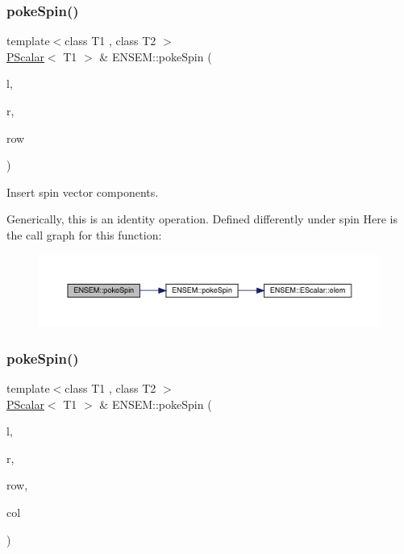 \subsubsection{\texorpdfstring{pokeSpin()}{pokeSpin()}\hspace{0.1cm}{\footnotesize\ttfamily [1/2]}}
{\footnotesize\ttfamily template$<$class T1 , class T2 $>$ \\
\mbox{\hyperlink{classENSEM_1_1PScalar}{P\+Scalar}}$<$ T1 $>$ \& E\+N\+S\+E\+M\+::poke\+Spin (\begin{DoxyParamCaption}\item[{\mbox{\hyperlink{classENSEM_1_1PScalar}{P\+Scalar}}$<$ T1 $>$ \&}]{l,  }\item[{const \mbox{\hyperlink{classENSEM_1_1PScalar}{P\+Scalar}}$<$ T2 $>$ \&}]{r,  }\item[{int}]{row }\end{DoxyParamCaption})\hspace{0.3cm}{\ttfamily [inline]}}



Insert spin vector components. 

Generically, this is an identity operation. Defined differently under spin Here is the call graph for this function\+:\nopagebreak
\begin{figure}[H]
\begin{center}
\leavevmode
\includegraphics[width=350pt]{db/dcc/group__primscalar_gaef0821cb16093e96134a98e5a765c45a_cgraph}
\end{center}
\end{figure}
\mbox{\label{group__primscalar_gafc9650865b3cf15e32d79e07d1c01eff}} 
\subsubsection{\texorpdfstring{pokeSpin()}{pokeSpin()}\hspace{0.1cm}{\footnotesize\ttfamily [2/2]}}
{\footnotesize\ttfamily template$<$class T1 , class T2 $>$ \\
\mbox{\hyperlink{classENSEM_1_1PScalar}{P\+Scalar}}$<$ T1 $>$ \& E\+N\+S\+E\+M\+::poke\+Spin (\begin{DoxyParamCaption}\item[{\mbox{\hyperlink{classENSEM_1_1PScalar}{P\+Scalar}}$<$ T1 $>$ \&}]{l,  }\item[{const \mbox{\hyperlink{classENSEM_1_1PScalar}{P\+Scalar}}$<$ T2 $>$ \&}]{r,  }\item[{int}]{row,  }\item[{int}]{col }\end{DoxyParamCaption})\hspace{0.3cm}{\ttfamily [inline]}}




